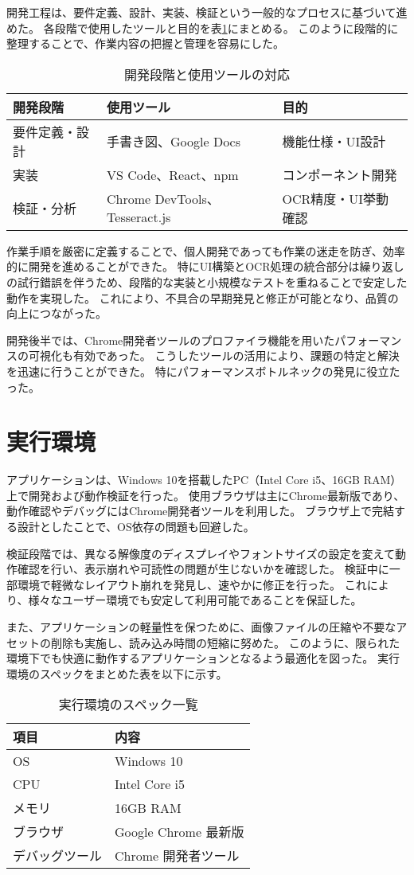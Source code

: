 \documentclass[main]{subfiles}
\begin{document}
開発工程は、要件定義、設計、実装、検証という一般的なプロセスに基づいて進めた。  
各段階で使用したツールと目的を表\ref{tab:dev_phases}にまとめる。  
このように段階的に整理することで、作業内容の把握と管理を容易にした。

\begin{table}[htbp]
\centering
\caption{開発段階と使用ツールの対応}
\label{tab:dev_phases}
\begin{tabular}{lll}
\hline
開発段階 & 使用ツール & 目的 \\
\hline
要件定義・設計 & 手書き図、Google Docs & 機能仕様・UI設計 \\
実装 & VS Code、React、npm & コンポーネント開発 \\
検証・分析 & Chrome DevTools、Tesseract.js & OCR精度・UI挙動確認 \\
\hline
\end{tabular}
\end{table}

作業手順を厳密に定義することで、個人開発であっても作業の迷走を防ぎ、効率的に開発を進めることができた。  
特にUI構築とOCR処理の統合部分は繰り返しの試行錯誤を伴うため、段階的な実装と小規模なテストを重ねることで安定した動作を実現した。  
これにより、不具合の早期発見と修正が可能となり、品質の向上につながった。

開発後半では、Chrome開発者ツールのプロファイラ機能を用いたパフォーマンスの可視化も有効であった。  
こうしたツールの活用により、課題の特定と解決を迅速に行うことができた。  
特にパフォーマンスボトルネックの発見に役立たった。
\section{実行環境}

アプリケーションは、Windows 10を搭載したPC（Intel Core i5、16GB RAM）上で開発および動作検証を行った。  
使用ブラウザは主にChrome最新版であり、動作確認やデバッグにはChrome開発者ツールを利用した。  
ブラウザ上で完結する設計としたことで、OS依存の問題も回避した。

検証段階では、異なる解像度のディスプレイやフォントサイズの設定を変えて動作確認を行い、表示崩れや可読性の問題が生じないかを確認した。
検証中に一部環境で軽微なレイアウト崩れを発見し、速やかに修正を行った。  
これにより、様々なユーザー環境でも安定して利用可能であることを保証した。

また、アプリケーションの軽量性を保つために、画像ファイルの圧縮や不要なアセットの削除も実施し、読み込み時間の短縮に努めた。  
このように、限られた環境下でも快適に動作するアプリケーションとなるよう最適化を図った。  
実行環境のスペックをまとめた表を以下に示す。

\begin{table}[htbp]
\centering
\caption{実行環境のスペック一覧}
\label{tab:execution_environment}
\begin{tabular}{ll}
\hline
項目 & 内容 \\
\hline
OS & Windows 10 \\
CPU & Intel Core i5 \\
メモリ & 16GB RAM \\
ブラウザ & Google Chrome 最新版 \\
デバッグツール & Chrome 開発者ツール \\
\hline
\end{tabular}
\end{table}
\end{document}
